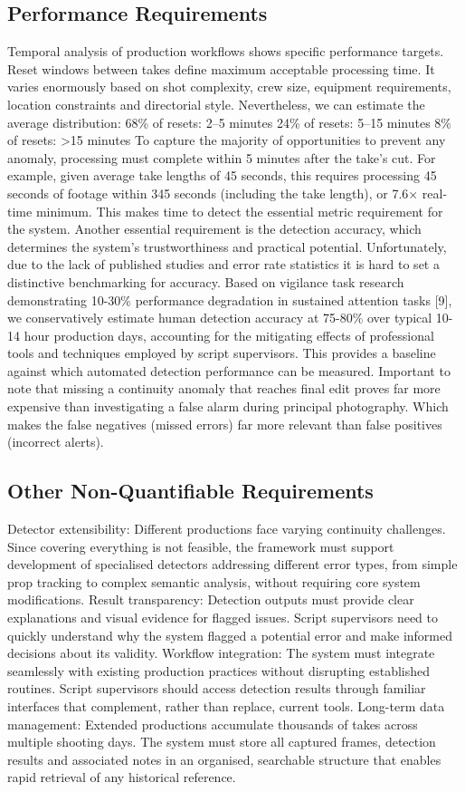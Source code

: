 \subsection{Performance Requirements}
Temporal analysis of production workflows shows specific performance targets. Reset windows between takes define maximum acceptable processing time. It varies enormously based on shot complexity, crew size, equipment requirements, location constraints and directorial style. Nevertheless, we can estimate the average distribution:
68\% of resets: 2–5 minutes
24\% of resets: 5–15 minutes
8\% of resets: >15 minutes
To capture the majority of opportunities to prevent any anomaly, processing must complete within 5 minutes after the take's cut. For example, given average take lengths of 45 seconds, this requires processing 45 seconds of footage within 345 seconds (including the take length), or 7.6× real-time minimum. This makes time to detect the essential metric requirement for the system.
Another essential requirement is the detection accuracy, which determines the system's trustworthiness and practical potential. Unfortunately, due to the lack of published studies and error rate statistics it is hard to set a distinctive benchmarking for accuracy. Based on vigilance task research demonstrating 10-30\% performance degradation in sustained attention tasks [9], we conservatively estimate human detection accuracy at 75-80\% over typical 10-14 hour production days, accounting for the mitigating effects of professional tools and techniques employed by script supervisors. This provides a baseline against which automated detection performance can be measured.
Important to note that missing a continuity anomaly that reaches final edit proves far more expensive than investigating a false alarm during principal photography. Which makes the false negatives (missed errors) far more relevant than false positives (incorrect alerts).
\subsection{Other Non-Quantifiable Requirements}
Detector extensibility: Different productions face varying continuity challenges. Since covering everything is not feasible, the framework must support development of specialised detectors addressing different error types, from simple prop tracking to complex semantic analysis, without requiring core system modifications.
Result transparency: Detection outputs must provide clear explanations and visual evidence for flagged issues. Script supervisors need to quickly understand why the system flagged a potential error and make informed decisions about its validity.
Workflow integration: The system must integrate seamlessly with existing production practices without disrupting established routines. Script supervisors should access detection results through familiar interfaces that complement, rather than replace, current tools.
Long-term data management: Extended productions accumulate thousands of takes across multiple shooting days. The system must store all captured frames, detection results and associated notes in an organised, searchable structure that enables rapid retrieval of any historical reference. 
